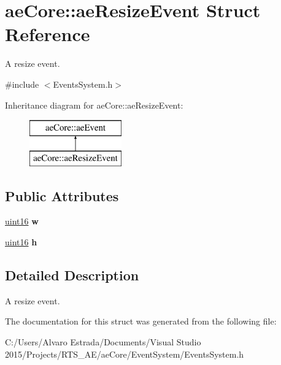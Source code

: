 \hypertarget{structae_core_1_1ae_resize_event}{}\section{ae\+Core\+:\+:ae\+Resize\+Event Struct Reference}
\label{structae_core_1_1ae_resize_event}


A resize event.  




{\ttfamily \#include $<$Events\+System.\+h$>$}

Inheritance diagram for ae\+Core\+:\+:ae\+Resize\+Event\+:\begin{figure}[H]
\begin{center}
\leavevmode
\includegraphics[height=2.000000cm]{structae_core_1_1ae_resize_event}
\end{center}
\end{figure}
\subsection*{Public Attributes}
\begin{DoxyCompactItemize}
\item 
\hyperlink{namespaceae_core_a1f9c426e6389a4ee13ee36ad25ec447d}{uint16} {\bfseries w}\hypertarget{structae_core_1_1ae_resize_event_ac8c75f55c1705aa5fcd015831d924d39}{}\label{structae_core_1_1ae_resize_event_ac8c75f55c1705aa5fcd015831d924d39}

\item 
\hyperlink{namespaceae_core_a1f9c426e6389a4ee13ee36ad25ec447d}{uint16} {\bfseries h}\hypertarget{structae_core_1_1ae_resize_event_a492e181f49f7a7b13f40ebc14677ed0d}{}\label{structae_core_1_1ae_resize_event_a492e181f49f7a7b13f40ebc14677ed0d}

\end{DoxyCompactItemize}


\subsection{Detailed Description}
A resize event. 

The documentation for this struct was generated from the following file\+:\begin{DoxyCompactItemize}
\item 
C\+:/\+Users/\+Alvaro Estrada/\+Documents/\+Visual Studio 2015/\+Projects/\+R\+T\+S\+\_\+\+A\+E/ae\+Core/\+Event\+System/Events\+System.\+h\end{DoxyCompactItemize}
